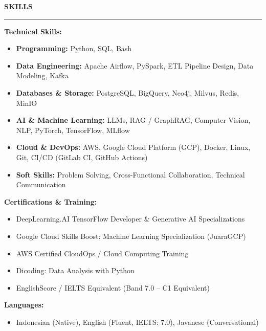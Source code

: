 \documentclass[a4paper,10pt]{article}
\newcommand{\cvsection}[1]{%
    \vspace{5pt}%
    {\fontsize{10.5pt}{12pt}\selectfont \textbf{#1}}\\[-4pt]%
    \rule{\textwidth}{0.5pt}%
    \vspace{2.5pt}%
}
\begin{document}
\cvsection{SKILLS}

\textbf{Technical Skills:}
\begin{itemize}
    \item \textbf{Programming:} Python, SQL, Bash
    \item \textbf{Data Engineering:} Apache Airflow, PySpark, ETL Pipeline Design, Data Modeling, Kafka
    \item \textbf{Databases \& Storage:} PostgreSQL, BigQuery, Neo4j, Milvus, Redis, MinIO
    \item \textbf{AI \& Machine Learning:} LLMs, RAG / GraphRAG, Computer Vision, NLP, PyTorch, TensorFlow, MLflow
    \item \textbf{Cloud \& DevOps:} AWS, Google Cloud Platform (GCP), Docker, Linux, Git, CI/CD (GitLab CI, GitHub Actions)
    \item \textbf{Soft Skills:} Problem Solving, Cross-Functional Collaboration, Technical Communication
\end{itemize}

\vspace{3pt}
\textbf{Certifications \& Training:}
\begin{itemize}
    \item DeepLearning.AI TensorFlow Developer \& Generative AI Specializations
    \item Google Cloud Skills Boost: Machine Learning Specialization (JuaraGCP)
    \item AWS Certified CloudOps / Cloud Computing Training
    \item Dicoding: Data Analysis with Python
    \item EnglishScore / IELTS Equivalent (Band 7.0 -- C1 Equivalent)
\end{itemize}

\vspace{3pt}
\textbf{Languages:}
\begin{itemize}
    \item Indonesian (Native), English (Fluent, IELTS: 7.0), Javanese (Conversational)
\end{itemize}
\end{document}
